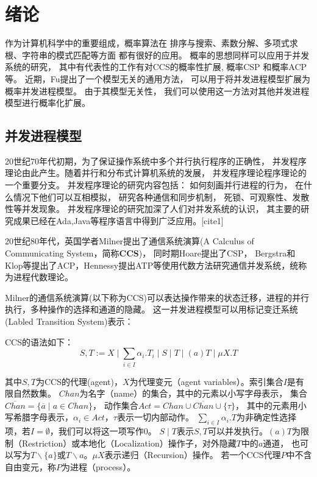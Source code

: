 
\chapter{绪论}

作为计算机科学中的重要组成，概率算法在
排序与搜索、素数分解、多项式求根、字符串的模式匹配等方面
都有很好的应用。
概率的思想同样可以应用于并发系统的研究，
其中有代表性的工作有对CCS的概率性扩展\cite{9,10},
概率CSP\cite{11} 和概率ACP\cite{12}等。
近期，Fu提出了一个模型无关的通用方法，
可以用于将并发进程模型扩展为概率并发进程模型。
由于其模型无关性，
我们可以使用这一方法对其他并发进程模型进行概率化扩展。

\section{并发进程模型}
  20世纪70年代初期，为了保证操作系统中多个并行执行程序的正确性，
  并发程序理论由此产生。随着并行和分布式计算机系统的发展，
  并发程序理论程序理论的一个重要分支。
  并发程序理论的研究内容包括：
  如何刻画并行进程的行为，
  在什么情况下他们可以互相模拟，
  研究各种通信和同步机制，
  死锁、可观察性、发散性等并发现象。
  并发程序理论的研究加深了人们对并发系统的认识，
  其主要的研究成果已经在Ada,Java等程序语言中得到广泛应用。[cite1]

   20世纪80年代，英国学者Milner提出了通信系统演算(A Calculus of Communicating System，简称\textbf{CCS})\cite{2}，
   同时期Hoare提出了CSP\cite{3}，
   Bergstra和Klop等提出了ACP\cite{4}，Hennessy提出ATP\cite{5}等使用代数方法研究通信并发系统，统称为进程代数理论。

   Milner的通信系统演算(以下称为CCS)可以表达操作带来的状态迁移，进程的并行执行，多种操作的选择和通道的隐藏。
   这一并发进程模型可以用标记变迁系统(Labled Transition System)表示：

   CCS的语法如下：
   $$S,T:=X\mid \sum_{i\in I}\alpha_i.T_i\mid S\mid T \mid (a)T \mid \mu X.T$$

   其中$S,T$为CCS的代理(agent)，$X$为代理变元（agent variables）。索引集合$I$是有限自然数集。
   $Chan$为名字（name）的集合，其中的元素以小写字母表示，
   集合$\overline{Chan}=\{\overline{a}\mid a\in Chan\}$，
   动作集合$Act=Chan\cup \overline{Chan}\cup \{\tau\} $，
   其中的元素用小写希腊字母表示，$\alpha_i\in Act$，$\tau$表示一切内部动作。
   $\sum_{i\in I}\alpha_i.T$为非确定性选择项，若$I=\emptyset$，我们可以将这一项写作$0$。
   $S\mid T$表示$S,T$可以并发执行。$(a)T$为限制（Restriction）或本地化（Localization）操作子，对外隐藏$T$中的$a$通道，
   也可以写为$T\backslash \{a\}$或$T\backslash a$。$\mu X$表示递归（Recursion）操作。
   若一个CCS代理$P$中不含自由变元，称$P$为进程（process）。

